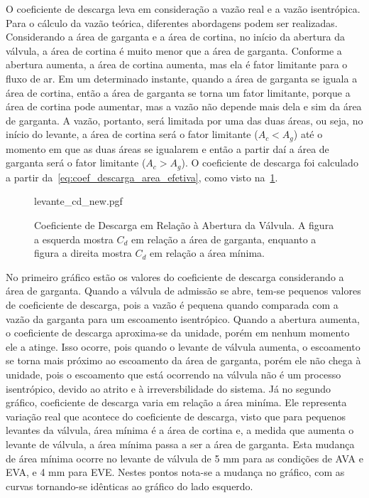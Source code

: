 O coeficiente de descarga leva em consideração a vazão real e a vazão isentrópica.
Para o cálculo da vazão teórica, diferentes abordagens podem ser realizadas.
Considerando a área de garganta e a área de cortina, no início da abertura da válvula, a área de cortina é muito menor que a área de garganta.
Conforme a abertura aumenta, a área de cortina aumenta, mas ela é fator limitante para o fluxo de ar.
Em um determinado instante, quando a área de garganta se iguala a área de cortina, então a área de garganta se torna um fator limitante, porque a área de cortina pode aumentar, mas a vazão não depende mais dela e sim da área de garganta.
A vazão, portanto, será limitada por uma das duas áreas, ou seja, no início do levante, a área de cortina será o fator limitante ($A_c < A_g$) até o momento em que as duas áreas se igualarem e então a partir daí a área de garganta será o fator limitante ($A_c > A_g$).
O coeficiente de descarga foi calculado a partir da~\cref{eq:coef_descarga_area_efetiva}, como visto na~\cref{fig:fluxo_cd}.
%
\begin{figure}[!htb]
    \centering
    \caption[Coeficiente de Descarga em Relação à Abertura da Válvula]{Coeficiente de Descarga em Relação à Abertura da Válvula. A figura a esquerda mostra $C_d$ em relação a área de garganta, enquanto a figura a direita mostra $C_d$ em relação a área mínima.}
    {levante_cd_new.pgf}
    \label{fig:fluxo_cd}
\end{figure}
%
No primeiro gráfico estão  os valores do coeficiente de descarga considerando a área de garganta. 
Quando a válvula de admissão se abre, tem-se pequenos valores de coeficiente de descarga, pois a vazão é pequena quando comparada com a vazão da garganta para um escoamento isentrópico. 
Quando a abertura aumenta, o coeficiente de descarga aproxima-se da unidade, porém em nenhum momento ele a atinge. 
Isso ocorre, pois quando o levante de válvula aumenta, o escoamento se torna mais próximo ao escoamento da área de garganta, porém ele não chega à unidade, pois o escoamento que está ocorrendo na válvula não é um processo isentrópico, devido ao atrito e à irreversbilidade do sistema.
Já no segundo gráfico, coeficiente de descarga varia em relação a área miníma.
Ele representa variação real que acontece do coeficiente de descarga, visto que para pequenos levantes da válvula, área mínima é a área de cortina e, a medida que aumenta o levante de válvula, a área mínima passa a ser a área de garganta. 
Esta mudança de área mínima ocorre no levante de válvula de 5 mm para as condições de AVA e EVA, e 4 mm para EVE. Nestes pontos nota-se a mudança no gráfico, com as curvas tornando-se idênticas ao gráfico do lado esquerdo.

